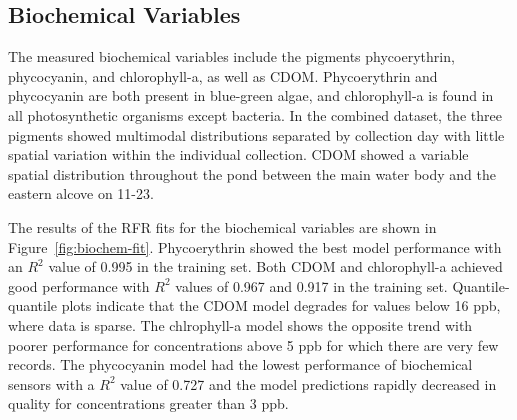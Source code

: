 \documentclass[remotesensing,article,submit,pdftex,moreauthors]{Definitions/mdpi}
\begin{document}
\subsection{Biochemical Variables}

The measured biochemical variables include the pigments phycoerythrin, phycocyanin, and chlorophyll-a, as well as CDOM. Phycoerythrin and phycocyanin are both present in blue-green algae, and chlorophyll-a is found in all photosynthetic organisms except bacteria. In the combined dataset, the three pigments showed multimodal distributions separated by collection day with little spatial variation within the individual collection. CDOM showed a variable spatial distribution throughout the pond between the main water body and the eastern alcove on 11-23.

The results of the RFR fits for the biochemical variables are shown in Figure~\ref{fig:biochem-fit}. Phycoerythrin showed the best model performance with an $R^2$ value of 0.995 in the training set. Both CDOM and chlorophyll-a achieved good performance with $R^2$ values of 0.967 and 0.917 in the training set. Quantile-quantile plots indicate that the CDOM model degrades for values below 16 ppb, where data is sparse. The chlrophyll-a model shows the opposite trend with poorer performance for concentrations above 5 ppb for which there are very few records. The phycocyanin model had the lowest performance of biochemical sensors with a $R^2$ value of 0.727 and the model predictions rapidly decreased in quality for concentrations greater than 3 ppb. 
\end{document}
